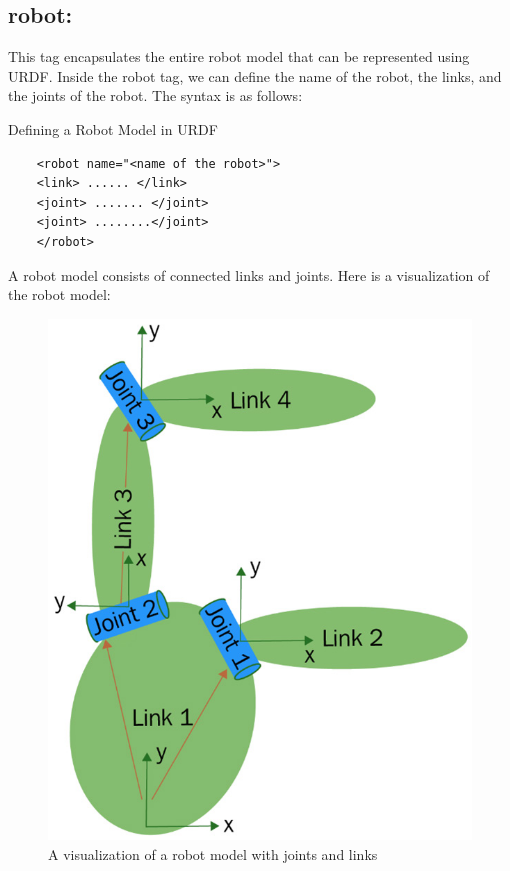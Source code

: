 \documentclass[../../main]{subfiles}
\begin{document}
\subsection{robot:}
This tag encapsulates the entire robot model that can be represented using
URDF. Inside the robot tag, we can define the name of the robot, the links, and the
joints of the robot.
The syntax is as follows:

\begin{codebox}[]{Defining a Robot Model in URDF}
  \begin{verbatim}
    <robot name="<name of the robot>">
    <link> ...... </link>
    <joint> ....... </joint>
    <joint> ........</joint>
    </robot>
\end{verbatim}
  \end{codebox}
A robot model consists of connected links and joints. Here is a visualization of the
robot model:
\begin{figure}[ht]
    \centering
    \includegraphics{sublatex/hashem/img/robot1.jpg}
    \caption{A visualization of a robot model with joints and links\cite{joseph2018mastering}}
\end{figure}
\end{document}
